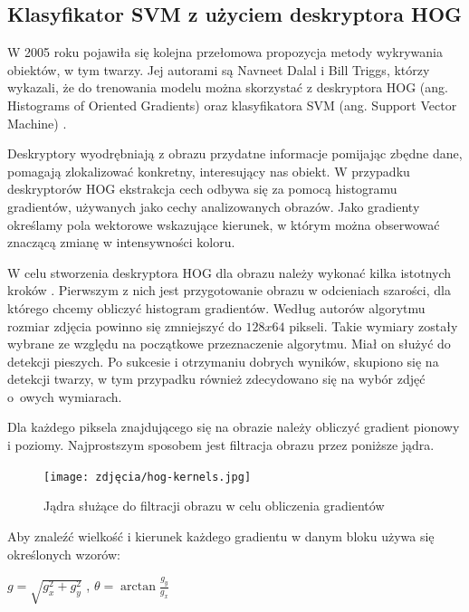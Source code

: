 
\subsection{Klasyfikator SVM z użyciem deskryptora HOG}
\label{sec:svmhog}
W 2005 roku pojawiła się kolejna przełomowa propozycja metody wykrywania obiektów, w tym twarzy. Jej autorami są Navneet Dalal i Bill Triggs, którzy wykazali, że do trenowania modelu można skorzystać z deskryptora HOG (ang. Histograms of Oriented Gradients) oraz klasyfikatora SVM (ang. Support Vector Machine) \cite{hog}. 

Deskryptory wyodrębniają z obrazu przydatne informacje pomijając zbędne dane, pomagają zlokalizować konkretny, interesujący nas obiekt. W przypadku deskryptorów HOG  ekstrakcja cech odbywa się za pomocą histogramu gradientów, używanych jako cechy analizowanych obrazów. Jako gradienty określamy pola wektorowe wskazujące kierunek, w którym można obserwować znaczącą zmianę w intensywności koloru.

W celu stworzenia deskryptora HOG dla obrazu należy wykonać kilka istotnych kroków \cite{hog2}. Pierwszym z nich jest przygotowanie obrazu w odcieniach szarości, dla którego chcemy obliczyć histogram gradientów. Według autorów algorytmu rozmiar zdjęcia powinno się zmniejszyć do $128x64$ pikseli. Takie wymiary zostały wybrane ze względu na początkowe przeznaczenie algorytmu. Miał on służyć do detekcji pieszych. Po sukcesie i otrzymaniu dobrych wyników, skupiono się na detekcji twarzy, w tym przypadku również zdecydowano się na wybór zdjęć o~owych wymiarach.

Dla każdego piksela znajdującego się na obrazie należy obliczyć gradient pionowy i poziomy. Najprostszym sposobem jest filtracja obrazu przez poniższe jądra.

\begin{figure}[h]
	\centering
	\texttt{[image: zdjęcia/hog-kernels.jpg]}
	\caption{Jądra służące do filtracji obrazu w celu obliczenia gradientów \cite{hog2}} 
	\label{fig:hogKernels}
\end{figure}

Aby znaleźć wielkość i kierunek każdego gradientu w danym bloku używa się określonych wzorów:
\begin{center}
    $g=\sqrt{g_{x}^{2}+g_{y}^{2}}$ ,
    $\theta=\arctan \frac{g_{y}}{g_{x}}$
\end{center}

